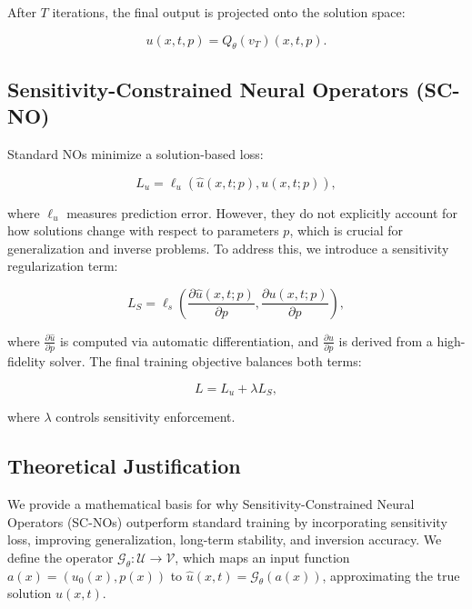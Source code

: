 
After \( T \) iterations, the final output is projected onto the solution space:

\begin{equation}
u(x, t, p) = Q_\theta(v_T)(x, t, p).
\end{equation}

\subsection*{Sensitivity-Constrained Neural Operators (SC-NO)}
Standard NOs minimize a solution-based loss:

\begin{equation}
L_u = \ell_u(\hat{u}(x, t; p), u(x, t; p)),
\end{equation}

where \( \ell_u \) measures prediction error. However, they do not explicitly account for how solutions change with respect to parameters \( p \), which is crucial for generalization and inverse problems. To address this, we introduce a sensitivity regularization term:

\begin{equation}
L_S = \ell_s\left( \frac{\partial \hat{u}(x, t; p)}{\partial p}, \frac{\partial u(x, t; p)}{\partial p} \right),
\end{equation}

where \( \frac{\partial \hat{u}}{\partial p} \) is computed via automatic differentiation, and \( \frac{\partial u}{\partial p} \) is derived from a high-fidelity solver. The final training objective balances both terms:

\begin{equation}
L = L_u + \lambda L_S,
\end{equation}

where \( \lambda \) controls sensitivity enforcement. 






\subsection*{Theoretical Justification} \label{prove}

We provide a mathematical basis for why Sensitivity-Constrained Neural Operators (SC-NOs) outperform standard training by incorporating sensitivity loss, improving generalization, long-term stability, and inversion accuracy. We define the operator $\mathcal{G}_\theta: \mathcal{U} \to \mathcal{V}$, which maps an input function $a(x) = (u_0(x), p(x))$ to $\hat{u}(x,t) = \mathcal{G}_\theta(a(x))$, approximating the true solution $u(x,t)$.

